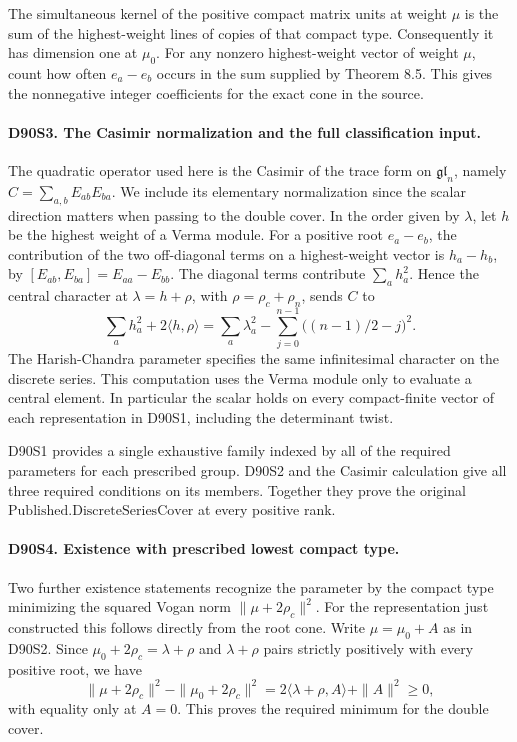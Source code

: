 The simultaneous kernel of the positive compact matrix units at
weight $\mu$ is the sum of the highest-weight lines of copies of
that compact type. Consequently it has dimension one at $\mu_0$.
For any nonzero highest-weight vector of weight $\mu$, count how
often $e_a-e_b$ occurs in the sum supplied by Theorem 8.5. This gives
the nonnegative integer coefficients for the exact cone in the source.

\paragraph{D90S3. The Casimir normalization and the full classification input.}
The quadratic operator used here is the Casimir of the trace form
on $\mathfrak{gl}_n$, namely $C=\sum_{a,b}E_{ab}E_{ba}$. We include
its elementary normalization since the scalar direction matters
when passing to the double cover. In the order given by
$\lambda$, let $h$ be the highest weight of a Verma module. For a
positive root $e_a-e_b$, the contribution of the two off-diagonal
terms on a highest-weight vector is $h_a-h_b$, by
$[E_{ab},E_{ba}]=E_{aa}-E_{bb}$. The diagonal terms contribute
$\sum_a h_a^2$. Hence the central character at
$\lambda=h+\rho$, with $\rho=\rho_c+\rho_n$, sends $C$ to
\[
  \sum_a h_a^2+2\langle h,\rho\rangle
     =\sum_a\lambda_a^2-\sum_{j=0}^{n-1}
                             \bigl((n-1)/2-j\bigr)^2 .
\]
The Harish-Chandra parameter specifies the same infinitesimal
character on the discrete series. This computation uses the Verma
module only to evaluate a central element. In particular the
scalar holds on every compact-finite vector of each representation
in D90S1, including the determinant twist.

D90S1 provides a single exhaustive family indexed by all of the
required parameters for each prescribed group. D90S2 and the
Casimir calculation give all three required conditions on its
members. Together they prove the original
$\mathrm{Published.DiscreteSeriesCover}$ at every positive rank.

\paragraph{D90S4. Existence with prescribed lowest compact type.}
Two further existence statements recognize the parameter by the
compact type minimizing the squared Vogan norm
$\|\mu+2\rho_c\|^2$. For the representation just constructed
this follows directly from the root cone. Write $\mu=\mu_0+A$ as
in D90S2. Since $\mu_0+2\rho_c=\lambda+\rho$ and
$\lambda+\rho$ pairs strictly positively with every positive
root, we have
\[
 \|\mu+2\rho_c\|^2-\|\mu_0+2\rho_c\|^2
   =2\langle\lambda+\rho,A\rangle+\|A\|^2\ge0,
\]
with equality only at $A=0$. This proves the required minimum
for the double cover.


